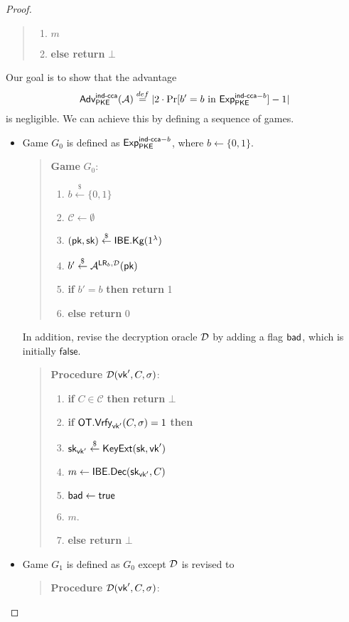 \documentclass[12pt]{article}
\newcommand{\eqdef}{\stackrel{def}{=}}
\newcommand{\bits}{\{0,1\}}
\newcommand{\getsr}{\stackrel{\$}{\gets}}
\newcommand{\Adv}{\textsf{Adv}}
\newcommand{\tab}{\hspace{0.3in}}
\newcommand{\Vrfy}{\textsf{Vrfy}}
\newcommand{\true}{\textsf{true}}
\newcommand{\false}{\textsf{false}}
\newcommand{\C}{\mathcal{C}}
\theoremstyle{definition}
\newcommand{\PKE}{\textsf{PKE}}
\newcommand{\Kg}{\textsf{Kg}}
\newcommand{\Dec}{\textsf{Dec}}
\newcommand{\pk}{\textsf{pk}}
\newcommand{\sk}{\textsf{sk}}
\newcommand{\A}{\mathcal{A}}
\newcommand{\LR}{\textsf{LR}}
\begin{document}
\begin{proof}
\begin{quote}
\begin{minipage}[t]{0.4\textwidth}
\begin{enumerate}
\item \tab {\bf return} $m$
\item {\bf else return} $\bot$
\end{enumerate}
\end{minipage}
\end{quote}
Our goal is to show that the advantage
$$\Adv_{\PKE}^{\cca}(\A) \eqdef | 2\cdot\Pr[\textrm{$b'=b$ in $\Exp_{\PKE}^{\cca-b}$}]-1 |$$
is negligible. We can achieve this by defining a sequence of games.
\begin{itemize}
\item Game $G_0$ is defined as $\Exp_{\PKE}^{\cca-b}$, where $b \gets \bits$. 
\begin{quote}
{\bf Game} $G_0$:
\begin{enumerate}
\item $b \getsr \bits$
\item $\C \gets \emptyset$
\item $(\pk, \sk) \getsr \IBE.\Kg(1^\lambda)$
\item $b' \getsr \A^{\LR_b, \D}(\pk)$
\item {\bf if} $b' = b$ {\bf then return} 1
\item {\bf else return} 0
\end{enumerate}
\end{quote}
In addition, revise the decryption oracle $\mathcal{D}$ by adding a flag $\textsf{bad}$, which is initially $\false$.
\begin{quote}
{\bf Procedure} $\mathcal{D}(\textsf{vk}', C,\sigma)$:
\begin{enumerate}
\item {\bf if} $C \in \C$ {\bf then return} $\bot$
\item {\bf if} $\OT.\Vrfy_{\vk'}(C,\sigma)=1$ {\bf then}
\item \tab $\sk_{\vk'} \getsr \KeyExt(\sk, \vk')$
\item \tab $m \gets \IBE.\Dec(\sk_{\vk'}, C)$
\item \tab $\bad \gets \true$
\item \tab {\bf return} $m$.
\item {\bf else return} $\bot$
\end{enumerate}
\end{quote}
\item Game $G_1$ is defined as $G_0$ except $\mathcal{D}$ is revised to
\begin{quote}
{\bf Procedure} $\mathcal{D}(\textsf{vk}', C,\sigma)$:

\end{quote}
\end{itemize}
\end{proof}
\end{document}
